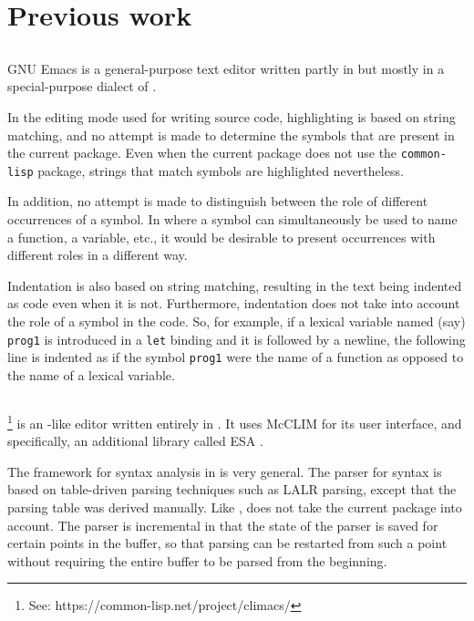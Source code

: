\section{Previous work}

\subsection{\emacs{}}
\label{sec-previous-emacs}

GNU Emacs \cite{Finseth:1980:TPTa,CraftOfTextEditiing} is a
general-purpose text editor written partly in \clanguage{} but mostly
in a special-purpose dialect of \lisp{}
\cite{GNUEmacsLispReferenceManual}.

In the editing mode used for writing \commonlisp{} source code,
highlighting is based on string matching, and no attempt is made to
determine the symbols that are present in the current package.  Even
when the current package does not use the \texttt{common-lisp}
package, strings that match \commonlisp{} symbols are highlighted
nevertheless.

In addition, no attempt is made to distinguish between the role of
different occurrences of a symbol.  In \commonlisp{} where a symbol
can simultaneously be used to name a function, a variable, etc., it
would be desirable to present occurrences with different roles in a
different way.

Indentation is also based on string matching, resulting in the text
being indented as \commonlisp{} code even when it is not.
Furthermore, indentation does not take into account the role of a
symbol in the code.  So, for example, if a lexical variable named
(say) \texttt{prog1} is introduced in a \texttt{let} binding and
it is followed by a newline, the following line is indented as if the
symbol \texttt{prog1} were the name of a \commonlisp{} function as
opposed to the name of a lexical variable.

\subsection{\climacs{}}

\climacs%
\footnote{See: https://common-lisp.net/project/climacs/}
is an \emacs{}-like editor written entirely in \commonlisp{}.  It uses
McCLIM \cite{Strandh:2002:ILC:McCLIM}
for its user interface, and specifically, an additional library called
ESA \cite{Strandh:2007:ECL:1622123.1622150}.

The framework for syntax analysis in \climacs{}
\cite{Rhodes.etal:2005} is very general.  The parser for \commonlisp{}
syntax is based on table-driven parsing techniques such as LALR
parsing, except that the parsing table was derived manually.  Like
\emacs{}, \climacs{} does not take the current package into account.
The parser is incremental in that the state of the parser is saved for
certain points in the buffer, so that parsing can be restarted from
such a point without requiring the entire buffer to be parsed from the
beginning.

